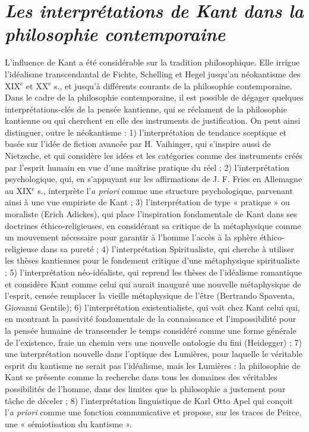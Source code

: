
\section{{\it Les interprétations de Kant dans la philosophie contemporaine}}

L'influence de Kant a été considérable
sur la tradition philosophique. Elle irrigue
l’idéalisme  transcendantal de Fichte,
Schelling et Hegel jusqu’au néokantisme
des {\footnotesize XIX}$^\text{e}$ et {\footnotesize XX}$^\text{e}$ s., et jusqu’à différents courants
de la philosophie contemporaine.
Dans le cadre de la philosophie contemporaine,
il est possible de dégager
quelques interprétations-clés de la pensée
kantienne, qui se réclament de la philosophie
kantienne ou qui cherchent en elle
des instruments de justification. On peut
ainsi distinguer, outre le néokantisme : 1)
l'interprétation de tendance sceptique et
basée sur l’idée de fiction avancée par
H. Vaihinger, qui s'inspire aussi de
Nietzsche, et qui considère les idées et les
catégories comme des instruments créés
par l'esprit humain en vue d’une maîtrise
pratique du réel ; 2) l'interprétation psychologique,
qui, en s'appuyant sur les
affirmations de J. F. Fries en Allemagne
au {\footnotesize XIX}$^\text{e}$ s., interprète l’{\it a priori} comme une
structure psychologique, parvenant ainsi à
une vue empiriste de Kant ; 3) l’interprétation
de type « pratique » ou moraliste
(Erich Adickes), qui place l'inspiration
fondamentale de Kant dans ses doctrines
éthico-religieuses, en considérant sa critique
de la métaphysique comme un mouvement
nécessaire pour garantir à
l’homme l’accès à la sphère éthico-religieuse
dans sa pureté ; 4) l'interprétation
Spiritualiste, qui cherche à utiliser les
thèses kantiennes pour le fondement critique
d’une métaphysique spiritualiste ; 5)
l'interprétation néo-idéaliste, qui reprend
les thèses de l’idéalisme romantique et
considère Kant comme celui qui aurait
inauguré une nouvelle métaphysique de
l'esprit, censée remplacer la vieille métaphysique
de l'être (Bertrando Spaventa,
Giovanni Gentile); 6) l'interprétation
existentialiste, qui voit chez Kant celui
qui, en montrant la passivité fondamentale
de la connaissance et l'impossibilité
pour la pensée humaine de transcender le
temps considéré comme une forme générale
de l’existence, fraie un chemin vers
une nouvelle ontologie du fini (Heidegger) ; 7)
une interprétation nouvelle dans
l'optique des Lumières, pour laquelle le
véritable esprit du kantisme ne serait pas
l’idéalisme, mais les Lumières : la philosophie
de Kant se présente comme la
recherche dans tous les domaines des
véritables possibilités de l’homme, dans
des limites que la philosophie a justement
pour tâche de déceler ; 8) l'interprétation
linguistique de Karl Otto Apel qui
conçoit l’{\it a priori} comme une fonction
communicative et propose, sur les traces
de Peirce, une « sémiotisation du kantisme ».

